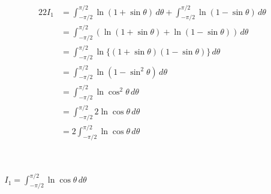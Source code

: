 \documentclass{article}
\begin{document}
{
\setlength{\abovedisplayskip}{0pt}
\begin{fleqn}
\begin{alignat*}{2}
2I_1 & = \int_{-\pi / 2}^{\pi / 2} \ln{(1 + \sin \theta)} \, d\theta + \int_{-\pi / 2}^{\pi / 2} \ln{(1 - \sin \theta)} \, d\theta \\
& = \int_{-\pi / 2}^{\pi / 2} (\ln{(1 + \sin \theta)} + \ln{(1 - \sin \theta)}) \, d\theta \\
& = \int_{-\pi / 2}^{\pi / 2} \ln{\{(1 + \sin \theta)(1 - \sin \theta)\}} \, d\theta \\
& = \int_{-\pi / 2}^{\pi / 2} \ln{(1 - \sin^2 \theta)} \, d\theta \\
& = \int_{-\pi / 2}^{\pi / 2} \ln{\cos^2 \theta} \, d\theta \\
& = \int_{-\pi / 2}^{\pi / 2} 2 \ln{\cos \theta} \, d\theta \\
& = 2 \int_{-\pi / 2}^{\pi / 2} \ln{\cos \theta} \, d\theta
\end{alignat*}
\end{fleqn}
}
\\
\par\noindent
$\begin{aligned}
I_1 = \int_{-\pi / 2}^{\pi / 2} \ln{\cos \theta} \, d\theta
\end{aligned}$
\\ \\ \\
\par\noindent
\end{document}
